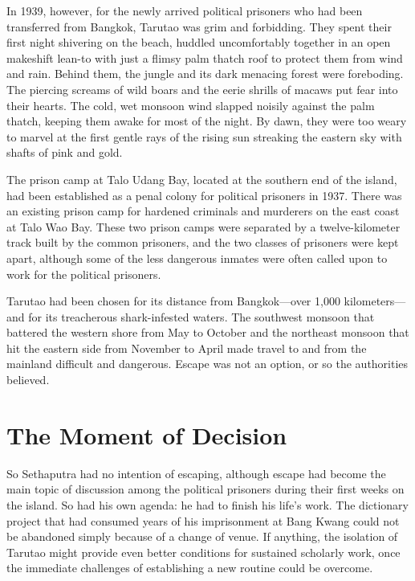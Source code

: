 \documentclass[
  Letterpaper,
]{scrbook}
\begin{document}
In 1939, however, for the newly arrived political prisoners who had been
transferred from Bangkok, Tarutao was grim and forbidding. They spent
their first night shivering on the beach, huddled uncomfortably together
in an open makeshift lean-to with just a flimsy palm thatch roof to
protect them from wind and rain. Behind them, the jungle and its dark
menacing forest were foreboding. The piercing screams of wild boars and
the eerie shrills of macaws put fear into their hearts. The cold, wet
monsoon wind slapped noisily against the palm thatch, keeping them awake
for most of the night. By dawn, they were too weary to marvel at the
first gentle rays of the rising sun streaking the eastern sky with
shafts of pink and gold.

The prison camp at Talo Udang Bay, located at the southern end of the
island, had been established as a penal colony for political prisoners
in 1937. There was an existing prison camp for hardened criminals and
murderers on the east coast at Talo Wao Bay. These two prison camps were
separated by a twelve-kilometer track built by the common prisoners, and
the two classes of prisoners were kept apart, although some of the less
dangerous inmates were often called upon to work for the political
prisoners.

Tarutao had been chosen for its distance from Bangkok---over 1,000
kilometers---and for its treacherous shark-infested waters. The
southwest monsoon that battered the western shore from May to October
and the northeast monsoon that hit the eastern side from November to
April made travel to and from the mainland difficult and dangerous.
Escape was not an option, or so the authorities believed.

\section{The Moment of Decision}\label{the-moment-of-decision}

So Sethaputra had no intention of escaping, although escape had become
the main topic of discussion among the political prisoners during their
first weeks on the island. So had his own agenda: he had to finish his
life's work. The dictionary project that had consumed years of his
imprisonment at Bang Kwang could not be abandoned simply because of a
change of venue. If anything, the isolation of Tarutao might provide
even better conditions for sustained scholarly work, once the immediate
challenges of establishing a new routine could be overcome.
\end{document}
